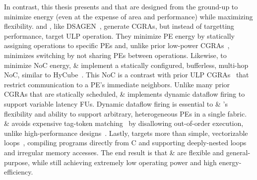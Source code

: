 In contrast, this thesis presents \snafu and \riptide that are designed from the ground-up to minimize energy (even at the expense of area and performance) while maximizing flexibility.
% 
\snafu and \riptide, like DSAGEN~\cite{weng2020dsagen}, generate CGRAs, but instead of targetting performance, target ULP operation.
%
They minimize PE energy by statically assigning operations
to specific PEs and, unlike prior low-power
CGRAs~\cite{tan2018stitch,karunaratne2017hycube,ipa,cma,srp},
minimizes switching by not sharing PEs between operations.
%
Likewise, to minimize NoC energy, \snafu \& \riptide implement a statically configured, bufferless, multi-hop NoC,
similar to HyCube~\cite{karunaratne2017hycube}.
This NoC is a contrast with prior ULP CGRAs~\cite{cma,srp,ipa}
that restrict communication to a PE's immediate neighbors.
%
Unlike many prior CGRAs that are statically scheduled,
\snafu \& \riptide implements dynamic dataflow firing
to support variable latency FUs.
%
Dynamic dataflow firing is essential to \snafu \& \riptide's flexibility
and ability to support arbitrary, heterogeneous PEs in a single fabric.
%
\snafu \& \riptide avoids expensive tag-token matching~\cite{plasticine,dyser}
by disallowing out-of-order execution, unlike high-performance designs~\cite{ttda,parashar2013triggered,voitsechov2014single,swanson2003wavescalar}.
% 
Lastly, \riptide targets more than simple, vectorizable loops~\cite{karunaratne2017hycube,ipa,cma,srp}, compiling programs directly from C and supporting deeply-nested loops and irregular memory accesses.
%
The end result is that \snafu \& \riptide are flexible and general-purpose,
while still achieving extremely low operating power and high energy-efficiency.

